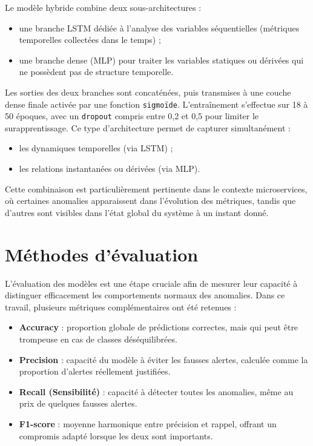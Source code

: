 \documentclass[a4paper,12pt]{report}
\begin{document}
Le modèle hybride combine deux sous-architectures :
\begin{itemize}
    \item une branche LSTM dédiée à l’analyse des variables séquentielles (métriques temporelles collectées dans le temps) ;
    \item une branche dense (MLP) pour traiter les variables statiques ou dérivées qui ne possèdent pas de structure temporelle.
\end{itemize}

Les sorties des deux branches sont concaténées, puis transmises à une couche dense finale activée par une fonction \texttt{sigmoïde}.  
L’entraînement s’effectue sur 18 à 50 époques, avec un \texttt{dropout} compris entre 0,2 et 0,5 pour limiter le surapprentissage.  
Ce type d’architecture permet de capturer simultanément :
\begin{itemize}
    \item les dynamiques temporelles (via LSTM) ;
    \item les relations instantanées ou dérivées (via MLP).
\end{itemize}
Cette combinaison est particulièrement pertinente dans le contexte microservices, où certaines anomalies apparaissent dans l’évolution des métriques, tandis que d’autres sont visibles dans l’état global du système à un instant donné.

\section{Méthodes d’évaluation}

L’évaluation des modèles est une étape cruciale afin de mesurer leur capacité à distinguer efficacement les comportements normaux des anomalies. Dans ce travail, plusieurs métriques complémentaires ont été retenues :

\begin{itemize}
    \item \textbf{Accuracy} : proportion globale de prédictions correctes, mais qui peut être trompeuse en cas de classes déséquilibrées.
    \item \textbf{Precision} : capacité du modèle à éviter les fausses alertes, calculée comme la proportion d’alertes réellement justifiées.
    \item \textbf{Recall (Sensibilité)} : capacité à détecter toutes les anomalies, même au prix de quelques fausses alertes.
    \item \textbf{F1-score} : moyenne harmonique entre précision et rappel, offrant un compromis adapté lorsque les deux sont importants.
\end{itemize}
\end{document}

